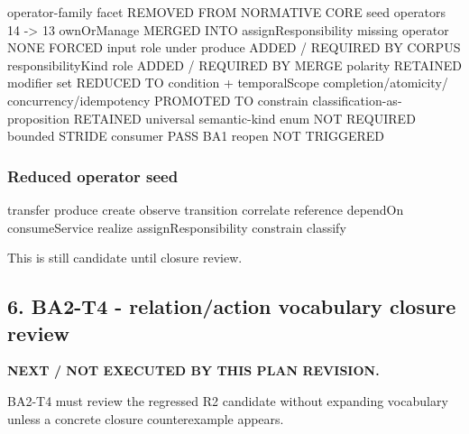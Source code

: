 \documentclass[
  10pt,
  a4paper,
]{article}
\newenvironment{Shaded}{}{}
\newcommand{\NormalTok}[1]{#1}
\begin{document}
\begin{Shaded}
\begin{Highlighting}[]
\NormalTok{operator{-}family facet            REMOVED FROM NORMATIVE CORE}
\NormalTok{seed operators                   14 {-}\textgreater{} 13}
\NormalTok{ownOrManage                      MERGED INTO assignResponsibility}
\NormalTok{missing operator                 NONE FORCED}
\NormalTok{input role under produce         ADDED / REQUIRED BY CORPUS}
\NormalTok{responsibilityKind role          ADDED / REQUIRED BY MERGE}
\NormalTok{polarity                         RETAINED}
\NormalTok{modifier set                     REDUCED TO condition + temporalScope}
\NormalTok{completion/atomicity/}
\NormalTok{concurrency/idempotency          PROMOTED TO constrain}
\NormalTok{classification{-}as{-}proposition   RETAINED}
\NormalTok{universal semantic{-}kind enum     NOT REQUIRED}
\NormalTok{bounded STRIDE consumer          PASS}
\NormalTok{BA1 reopen                       NOT TRIGGERED}
\end{Highlighting}
\end{Shaded}

\subsubsection{Reduced operator seed}\label{reduced-operator-seed}

\begin{Shaded}
\begin{Highlighting}[]
\NormalTok{transfer}
\NormalTok{produce}
\NormalTok{create}
\NormalTok{observe}
\NormalTok{transition}
\NormalTok{correlate}
\NormalTok{reference}
\NormalTok{dependOn}
\NormalTok{consumeService}
\NormalTok{realize}
\NormalTok{assignResponsibility}
\NormalTok{constrain}
\NormalTok{classify}
\end{Highlighting}
\end{Shaded}

This is still candidate until closure review.

\subsection{6. BA2-T4 - relation/action vocabulary closure
review}\label{6-ba2-t4---relationaction-vocabulary-closure-review}

\textbf{NEXT / NOT EXECUTED BY THIS PLAN REVISION.}

BA2-T4 must review the regressed R2 candidate without expanding
vocabulary unless a concrete closure counterexample appears.
\end{document}
